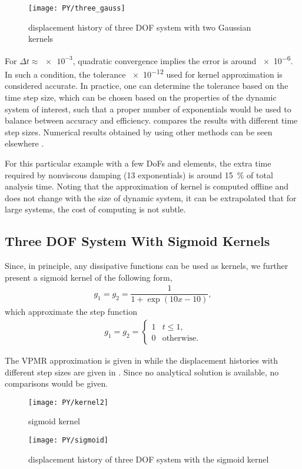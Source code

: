 \begin{figure}[H]
\centering
\texttt{[image: PY/three\_gauss]}
\caption{displacement history of three DOF system with two Gaussian kernels}\label{fig:three_gauss}
\end{figure}
For $\Delta{}t\approx\num{e-3}$, quadratic convergence implies the error is around \num{e-6}. In such a condition, the tolerance \num{e-12} used for kernel approximation is considered accurate. In practice, one can determine the tolerance based on the time step size, which can be chosen based on the properties of the dynamic system of interest, such that a proper number of exponentials would be used to balance between accuracy and efficiency.  compares the results with different time step sizes. Numerical results obtained by using other methods can be seen elsewhere \citep{Shen2021}.

For this particular example with a few DoFs and elements, the extra time required by nonviscous damping (\num{13} exponentials) is around \SI{15}{\percent} of total analysis time. Noting that the approximation of kernel is computed offline and does not change with the size of dynamic system, it can be extrapolated that for large systems, the cost of computing  is not subtle.
\subsection{Three DOF System With Sigmoid Kernels}
Since, in principle, any dissipative functions can be used as kernels, we further present a sigmoid kernel of the following form,
\begin{gather}
g_1=g_2=\dfrac{1}{1+\exp\left(10x-10\right)},
\end{gather}
which approximate the step function
\begin{gather}
g_1=g_2=\left\{
\begin{array}{ll}
1&t\leqslant1,\\
0&\text{otherwise.}
\end{array}
\right.
\end{gather}

The VPMR approximation is given in  while the displacement histories with different step sizes are given in . Since no analytical solution is available, no comparisons would be given.
\begin{figure}[H]
\centering
\texttt{[image: PY/kernel2]}
\caption{sigmoid kernel}\label{fig:sigmoid_kernel}
\end{figure}
\begin{figure}[H]
\centering
\texttt{[image: PY/sigmoid]}
\caption{displacement history of three DOF system with the sigmoid kernel}\label{fig:three_sigmoid}
\end{figure}